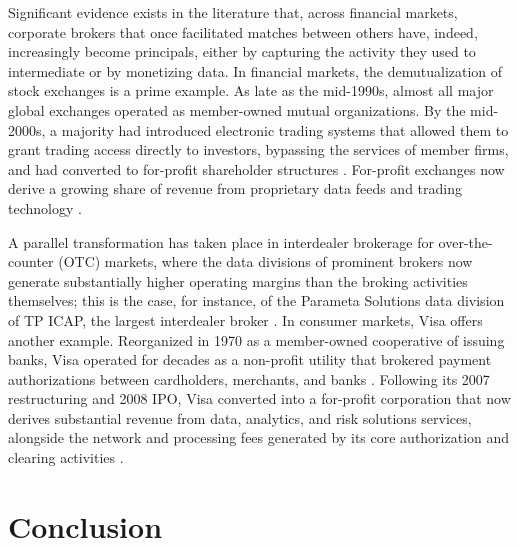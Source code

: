 \documentclass[
]{article}
\begin{document}
Significant evidence exists in the literature that, across financial markets, corporate brokers that once facilitated matches between others have, indeed, increasingly become principals, either by capturing the activity they used to intermediate or by monetizing data. In financial markets, the demutualization of stock exchanges is a prime example. As late as the mid-1990s, almost all major global exchanges operated as member-owned mutual organizations. By the mid-2000s, a majority had introduced electronic trading systems that allowed them to grant trading access directly to investors, bypassing the services of member firms, and had converted to for-profit shareholder structures \autocite{aggarwalDemutualizationCorporateGovernance2002,petryNationalMarketplacesGlobal2021}. For-profit exchanges now derive a growing share of revenue from proprietary data feeds and trading technology \autocite{mackenzieTradingSpeedLight2021,pardo-guerraAutomatingFinanceInfrastructures2019}.

A parallel transformation has taken place in interdealer brokerage for over-the-counter (OTC) markets, where the data divisions of prominent brokers now generate substantially higher operating margins than the broking activities themselves; this is the case, for instance, of the Parameta Solutions data division of TP ICAP, the largest interdealer broker \autocite{ARA_FullReport}. In consumer markets, Visa offers another example. Reorganized in 1970 as a member-owned cooperative of issuing banks, Visa operated for decades as a non-profit utility that brokered payment authorizations between cardholders, merchants, and banks \autocite{stearnsElectronicValueExchange2011}. Following its 2007 restructuring and 2008 IPO, Visa converted into a for-profit corporation that now derives substantial revenue from data, analytics, and risk solutions services, alongside the network and processing fees generated by its core authorization and clearing activities \autocite{VisaAnnualReport}.

\section{Conclusion}
\end{document}

